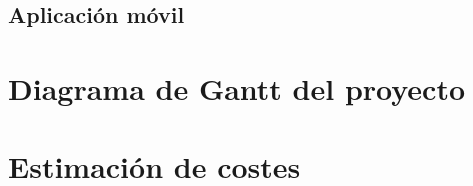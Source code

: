   \subsection{Aplicación móvil}

\section{Diagrama de Gantt del proyecto}

\section{Estimación de costes}


